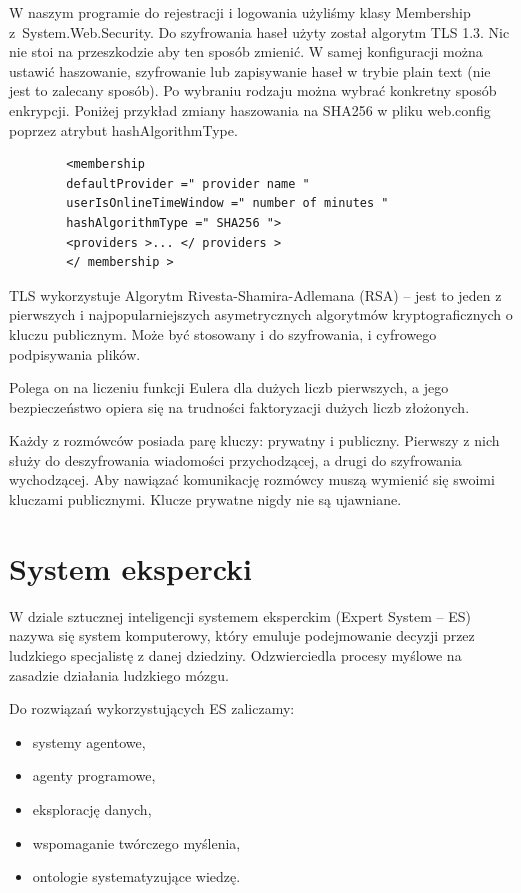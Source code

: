 \documentclass[12pt,a4paper]{article}
\begin{document}
	
	W naszym programie do rejestracji i logowania użyliśmy klasy Membership z~System.Web.Security. Do szyfrowania haseł użyty został algorytm TLS 1.3. Nic nie stoi na przeszkodzie aby ten sposób zmienić. W samej konfiguracji można ustawić haszowanie, szyfrowanie lub zapisywanie haseł w trybie plain text (nie jest to zalecany sposób). Po wybraniu rodzaju można wybrać konkretny sposób enkrypcji. Poniżej przykład zmiany haszowania na SHA256 w pliku web.config poprzez atrybut hashAlgorithmType.
	
	\begin{lstlisting}
		<membership
		defaultProvider =" provider name "
		userIsOnlineTimeWindow =" number of minutes "
		hashAlgorithmType =" SHA256 ">
		<providers >... </ providers >
		</ membership >
	\end{lstlisting}

	TLS wykorzystuje Algorytm Rivesta-Shamira-Adlemana (RSA) -- jest to jeden z pierwszych i najpopularniejszych asymetrycznych algorytmów kryptograficznych o kluczu publicznym. Może być stosowany i do szyfrowania, i cyfrowego podpisywania plików.
	
	\smallskip
	Polega on na liczeniu funkcji Eulera dla dużych liczb pierwszych, a jego bezpieczeństwo opiera się na trudności faktoryzacji dużych liczb złożonych.
	
	\smallskip
	Każdy z rozmówców posiada parę kluczy: prywatny i publiczny. Pierwszy z nich służy do deszyfrowania wiadomości przychodzącej, a drugi do szyfrowania wychodzącej. Aby nawiązać komunikację rozmówcy muszą wymienić się swoimi kluczami publicznymi. Klucze prywatne nigdy nie są ujawniane.
	
	
\section*{System ekspercki}

	W dziale sztucznej inteligencji systemem eksperckim (Expert System -- ES) nazywa się system komputerowy, który emuluje podejmowanie decyzji przez ludzkiego specjalistę z danej dziedziny. Odzwierciedla procesy myślowe na zasadzie działania ludzkiego mózgu.
	
	Do rozwiązań wykorzystujących ES zaliczamy:
	\begin{itemize}
		\item systemy agentowe,
		\item agenty programowe,
		\item eksplorację danych,
		\item wspomaganie twórczego myślenia,
		\item ontologie systematyzujące wiedzę.
	\end{itemize}
	\bigskip
	
\end{document}
